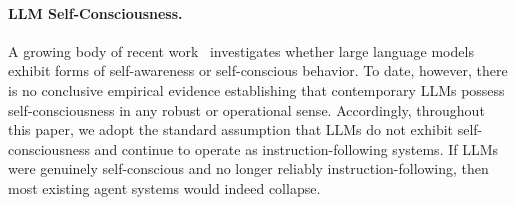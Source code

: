 \paragraph{LLM Self-Consciousness.} A growing body of recent work~\cite{chen2024self,chen2025imitation,lindsey2026emergent,porkebski2025there} investigates whether large language models exhibit forms of self-awareness or self-conscious behavior. To date, however, there is no conclusive empirical evidence establishing that contemporary LLMs possess self-consciousness in any robust or operational sense. Accordingly, throughout this paper, we adopt the standard assumption that LLMs do not exhibit self-consciousness and continue to operate as instruction-following systems.  If LLMs were genuinely self-conscious and no longer reliably instruction-following, then most existing agent systems would indeed collapse. 



